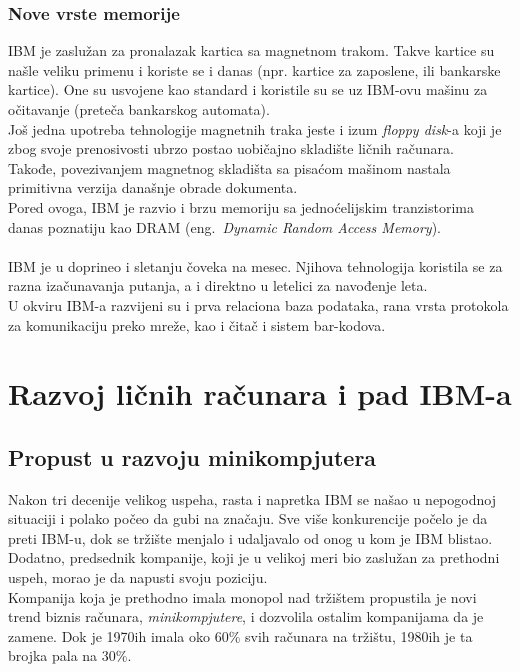 \documentclass[a4paper]{article}
\begin{document}
\subsubsection*{Nove vrste memorije}
IBM je zaslužan za pronalazak kartica sa magnetnom trakom. Takve kartice su našle veliku primenu i koriste se i danas (npr. kartice za zaposlene, ili bankarske kartice). One su usvojene kao standard i koristile su se uz IBM-ovu mašinu za očitavanje (preteča bankarskog automata).\\
Još jedna upotreba tehnologije magnetnih traka jeste i izum \emph{floppy disk}-a koji je zbog svoje prenosivosti ubrzo postao uobičajno skladište ličnih računara.\\ Takođe, povezivanjem magnetnog skladišta sa pisaćom mašinom nastala primitivna verzija današnje obrade dokumenta.\\
Pored ovoga, IBM je razvio i brzu memoriju sa jednoćelijskim tranzistorima danas poznatiju kao DRAM (eng.~{\em Dynamic Random Access Memory})\cite{timeline}.%
\\ \\
IBM je u doprineo i sletanju čoveka na mesec. Njihova tehnologija koristila se za razna izačunavanja putanja, a i direktno u letelici za navođenje leta.\\
U okviru IBM-a razvijeni su i prva relaciona baza podataka, rana vrsta protokola za komunikaciju preko mreže, kao i čitač i sistem bar-kodova.
%
\section{Razvoj ličnih računara i pad IBM-a}
\subsection{Propust u razvoju minikompjutera}
Nakon tri decenije velikog uspeha, rasta i napretka IBM se našao u nepogodnoj situaciji i polako počeo da gubi na značaju. %
Sve više konkurencije počelo je da preti IBM-u, dok se tržište menjalo i udaljavalo od onog u kom je IBM blistao. Dodatno, predsednik kompanije, koji je u velikoj meri bio zaslužan za prethodni uspeh, morao je da napusti svoju poziciju.\\%
Kompanija koja je prethodno imala monopol nad tržištem propustila je novi trend biznis računara, \emph{minikompjutere}, i dozvolila ostalim kompanijama da je zamene. Dok je 1970ih imala oko 60\% svih računara na tržištu, 1980ih je ta brojka pala na 30\%. %
\end{document}

